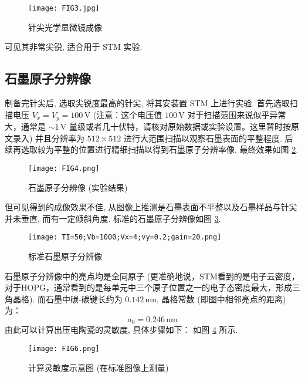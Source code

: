 \documentclass{whureport}
\begin{document}
\begin{multicols}{2}
\begin{figure}[H]
 \centering
 \texttt{[image: FIG3.jpg]} %
 \caption{针尖光学显微镜成像}
 \label{fig:tip_image}
\end{figure}
可见其非常尖锐, 适合用于 STM 实验.

\subsection{石墨原子分辨像}
制备完针尖后, 选取尖锐度最高的针尖, 将其安装置 STM 上进行实验.
首先选取扫描电压 \( V_x = V_y = 100 \, \text{V} \) (注意：这个电压值 \(100\,\text{V}\) 对于扫描范围来说似乎异常大，通常是 \( \sim 1\,\text{V} \) 量级或者几十伏特，请核对原始数据或实验设置。这里暂时按原文录入) 并且分辨率为 \( 512 \times 512 \) 进行大范围扫描以观察石墨表面的平整程度. 后续再选取较为平整的位置进行精细扫描以得到石墨原子分辨率像, 最终效果如图 \ref{fig:hopg_exp}.

\begin{figure}[H]
 \centering
 \texttt{[image: FIG4.png]} %
 \caption{石墨原子分辨像 (实验结果)}
 \label{fig:hopg_exp}
\end{figure}
但可见得到的成像效果不佳, 从图像上推测是石墨表面不平整以及石墨样品与针尖并未垂直, 而有一定倾斜角度.
标准的石墨原子分辨像如图 \ref{fig:hopg_std}.

\begin{figure}[H]
 \centering
 \texttt{[image: TI=50;Vb=1000;Vx=4;vy=0.2;gain=20.png]} %
 \caption{标准石墨原子分辨像}
 \label{fig:hopg_std}
\end{figure}
石墨原子分辨像中的亮点均是全同原子 (更准确地说，STM看到的是电子云密度，对于HOPG，通常看到的是每单元中三个原子位置之一的电子态密度最大，形成三角晶格). 而石墨中碳-碳键长约为 \( 0.142 \, \text{nm} \), 晶格常数 (即图中相邻亮点的距离) 为：
\[ a_0 = 0.246 \, \text{nm} \] %
由此可以计算出压电陶瓷的灵敏度, 具体步骤如下：
如图 \ref{fig:calibration} 所示.

\begin{figure}[H]
 \centering
 \texttt{[image: FIG6.png]} %
 \caption{计算灵敏度示意图 (在标准图像上测量)}
 \label{fig:calibration}
\end{figure}


\end{multicols}
\end{document}
